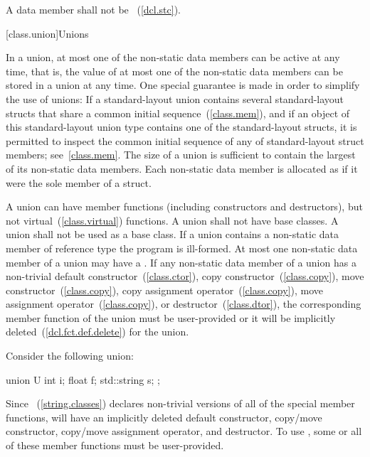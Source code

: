 \pnum
A  data member shall not be
~(\ref{dcl.stc}).

[class.union]{Unions}%

\pnum
In a union, at most one of the non-static data members can be active at any
time, that is, the value of at most one of the non-static data members can be
stored in a union at any time. \enternote One special guarantee is made in order to
simplify the use of unions: If a standard-layout union contains several standard-layout
structs that share a common initial sequence~(\ref{class.mem}), and if an object of this
standard-layout union type contains one of the standard-layout structs, it is permitted
to inspect the common initial sequence of any of standard-layout struct members;
see~\ref{class.mem}. \exitnote The size of a union is sufficient to contain the largest
of its non-static data members. Each non-static data member is allocated
as if it were the sole member of a struct.

\pnum
{}%
%
%
A union can have member functions (including constructors and destructors),
%
but not virtual~(\ref{class.virtual}) functions. A union shall not have
base classes. A union shall not be used as a base class.
%
If a union contains a non-static data member of
reference type the program is ill-formed.
At most one non-static data member of a union may have a
.
\enternote If any non-static data member of a union has a non-trivial
default constructor~(\ref{class.ctor}),
copy constructor~(\ref{class.copy}),
move constructor~(\ref{class.copy}),
copy assignment operator~(\ref{class.copy}),
move assignment operator~(\ref{class.copy}),
or destructor~(\ref{class.dtor}), the corresponding member function
of the union must be user-provided or it will
be implicitly deleted~(\ref{dcl.fct.def.delete}) for the union. \exitnote

\pnum
\enterexample Consider the following union:

\begin{codeblock}
union U {
  int i;
  float f;
  std::string s;
};
\end{codeblock}

Since ~(\ref{string.classes}) declares non-trivial versions of all of the special
member functions,  will have an implicitly deleted default constructor,
copy/move constructor,
copy/move assignment operator, and destructor.
To use , some or all of these member functions
must be user-provided.\exitexample

